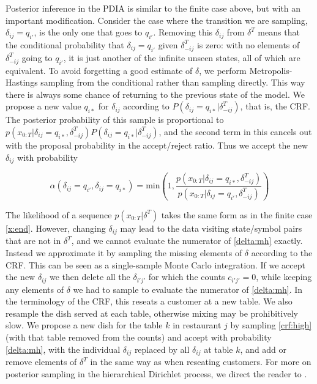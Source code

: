 Posterior inference in the PDIA is similar to the finite case above, but with an important modification.  Consider the case where the transition we are sampling, $\delta_{ij} = q_{i'}$, is the only one that goes to $q_{i'}$.  Removing this $\delta_{ij}$ from $\delta^T$ means that the conditional probability that $\delta_{ij} = q_{i'}$ given $\delta^T_{-ij}$ is zero: with no elements of $\delta^T_{-ij}$ going to $q_{i'}$, it is just another of the infinite unseen states, all of which are equivalent.  To avoid forgetting a good estimate of $\delta$, we perform Metropolis-Hastings sampling from the conditional rather than sampling directly.  This way there is always some chance of returning to the previous state of the model.  We propose a new value $q_{i*}$ for $\delta_{ij}$ according to $P(\delta_{ij} = q_{i*}|\delta^T_{-ij})$, that is, the CRF.  The posterior probability of this sample is proportional to $p(x_{0:T}|\delta_{ij}=q_{i*},\delta^T_{-ij})P(\delta_{ij} = q_{i*}|\delta^T_{-ij})$, and the second term in this cancels out with the proposal probability in the accept/reject ratio. Thus we accept the new $\delta_{ij}$ with probability

\begin{equation}
 \alpha(\delta_{ij}=q_{i'},\delta_{ij}=q_{i*}) =  \mathrm{min}\left(1,\frac{p(x_{0:T}|\delta_{ij}=q_{i*},\delta_{-ij}^T)}{p(x_{0:T}|\delta_{ij}=q_{i'},\delta_{-ij}^T)}\right) \label{delta:mh}
\end{equation}

The likelihood of a sequence $p(x_{0:T}|\delta^T)$ takes the same form as in the finite case \eqref{x:end}.  However, changing $\delta_{ij}$ may lead to the data visiting state/symbol pairs that are not in $\delta^T$, and we cannot evaluate the numerator of \eqref{delta:mh} exactly.  Instead we approximate it by sampling the missing elements of $\delta$ according to the CRF.  This can be seen as a single-sample Monte Carlo integration.  If we accept the new $\delta_{ij}$ we then delete all the $\delta_{i'j'}$ for which the counts $c_{i'j'} = 0$, while keeping any elements of $\delta$ we had to sample to evaluate the numerator of \eqref{delta:mh}.  In the terminology of the CRF, this reseats a customer at a new table.  We also resample the dish served at each table, otherwise mixing may be prohibitively slow.  We propose a new dish for the table $k$ in restaurant $j$ by sampling \eqref{crf:high} (with that table removed from the counts) and accept with probability \eqref{delta:mh}, with the individual $\delta_{ij}$ replaced by all $\delta_{ij}$ at table $k$, and add or remove elements of $\delta^T$ in the same way as when reseating customers.  For more on posterior sampling in the hierarchical Dirichlet process, we direct the reader to \cite{Teh2006}.
  

